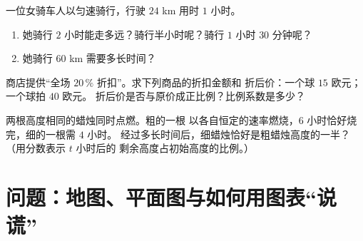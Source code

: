 \begin{exercise}[$\star\star$]\label{exo:g6:propdata:10}
一位女骑车人以匀速骑行，行驶 $24$ km 用时 $1$ 小时。
\begin{enumerate}
  \item 她骑行 $2$ 小时能走多远？骑行半小时呢？骑行
        $1$ 小时 $30$ 分钟呢？
  \item 她骑行 $60$ km 需要多长时间？
\end{enumerate}
\end{exercise}

\begin{exercise}[$\star\star$]\label{exo:g6:propdata:11}
商店提供“全场 $20\,\%$ 折扣”。求下列商品的折扣金额和
折后价：一个球 $15$ 欧元；一个球拍 $40$ 欧元。
折后价是否与原价成正比例？比例系数是多少？
\end{exercise}

\begin{exercise}[$\star\star\star$]\label{exo:g6:propdata:12}
两根高度相同的蜡烛同时点燃。粗的一根
以各自恒定的速率燃烧，$6$ 小时恰好烧完，细的一根需 $4$ 小时。
经过多长时间后，细蜡烛恰好是粗蜡烛高度的一半？
（用分数表示 $t$ 小时后的
剩余高度占初始高度的比例。）
\end{exercise}

\section{问题：地图、平面图与如何用图表“说谎”}


